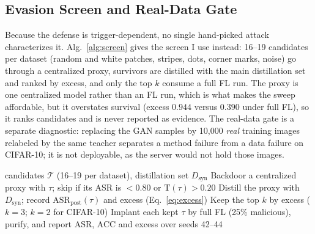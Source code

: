 \documentclass[conference]{IEEEtran}
\newcommand{\ASR}{\mathrm{ASR}}
\newcommand{\Texc}{\mathrm{T}}
\begin{document}
\subsection{Evasion Screen and Real-Data Gate}
Because the defense is trigger-dependent, no single hand-picked attack characterizes it. Alg.~\ref{alg:screen} gives the screen I use instead: 16--19 candidates per dataset (random and white patches, stripes, dots, corner marks, noise) go through a centralized proxy, survivors are distilled with the main distillation set and ranked by excess, and only the top $k$ consume a full FL run. The proxy is one centralized model rather than an FL run, which is what makes the sweep affordable, but it overstates survival (excess $0.944$ versus $0.390$ under full FL), so it ranks candidates and is never reported as evidence. The real-data gate is a separate diagnostic: replacing the GAN samples by 10{,}000 \emph{real} training images relabeled by the same teacher separates a method failure from a data failure on CIFAR-10; it is not deployable, as the server would not hold those images.

\begin{algorithm}[t]
\caption{Trigger screen and full-FL confirmation (my protocol)}
\label{alg:screen}
\begin{algorithmic}[1]
\Require candidates $\mathcal{T}$ (16--19 per dataset), distillation set $D_{\mathrm{syn}}$
  \State Backdoor a centralized proxy with $\tau$; skip if its ASR is $<0.80$ or $\Texc(\tau)>0.20$
  \State Distill the proxy with $D_{\mathrm{syn}}$; record $\ASR_{\mathrm{post}}(\tau)$ and excess (Eq.~\ref{eq:excess})
\EndFor
\State Keep the top $k$ by excess ($k=3$; $k=2$ for CIFAR-10)
\State Implant each kept $\tau$ by full FL (25\% malicious), purify, and report ASR, ACC and excess over seeds 42--44
\end{algorithmic}
\end{algorithm}
\end{document}
